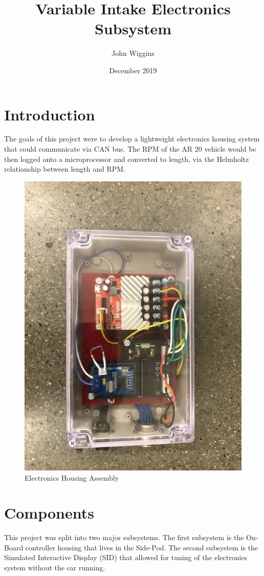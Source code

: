 \documentclass{article}
\title{Variable Intake Electronics Subsystem}
\author{John Wiggins }
\date{December 2019}
\begin{document}
\maketitle

\section{Introduction}
The goals of this project were to develop a lightweight electronics housing system that could communicate via CAN bus. The RPM of the AR 20 vehicle would be then logged onto a microprocessor and converted to length, via the Helmholtz relationship between length and RPM.


\begin{figure}[h!]
\centering
\includegraphics[scale=0.5, angle = 90]{Electronics_Housing.jpg}
\caption{Electronics Housing Assembly}
\label{fig:assembly}
\end{figure}

\section{Components}
This project was split into two major subsystems. The first subsystem is the On-Board controller housing that lives in the Side-Pod. The second subsystem is the Simulated Interactive Display (SID) that allowed for tuning of the electronics system without the car running.
\end{document}
